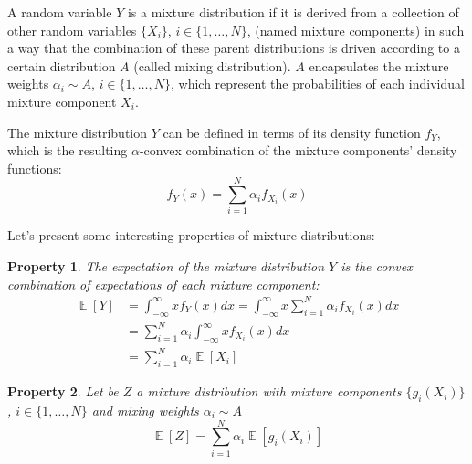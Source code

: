 \documentclass[12pt,a4paper,openright,twoside]{article}
\DeclareMathOperator*{\E}{\mathbb{E}}
\numberwithin{equation}{section}
\theoremstyle{definition}
\theoremstyle{remark}
\theoremstyle{plain}
\newtheorem{mixtureProperty}{Property}
\begin{document}
A random variable $Y$ is a mixture distribution if it is derived from a collection of other random variables $\{X_i\}$, $i\in \{1, \dots, N\}$, (named mixture components) in such a way that the combination of these parent distributions is driven according to a certain distribution $A$ (called mixing distribution). $A$ encapsulates the mixture weights $\alpha_i \sim A$, $i\in \{1, \dots, N\}$, which represent the probabilities of each individual mixture component $X_i$. 

The mixture distribution $Y$ can be defined in terms of its density function $f_Y$, which is the resulting $\alpha$-convex combination of the mixture components' density functions:
\begin{equation} \label{mixtureDef}
    f_{Y} (x) = \sum_{i=1}^{N} \alpha _i f_{X_i}(x)
\end{equation}

Let's present some interesting properties of mixture distributions:

\begin{mixtureProperty} \label{mixtureProperty1}
	The expectation of the mixture distribution $Y$ is the convex combination of expectations of each mixture component: 
    \begin{equation} \label{mixtureProperty1eq}
    \begin{split}
        \E [Y] &= \int_{-\infty}^{\infty} x f_{Y}(x) dx = \int_{-\infty}^{\infty} x \sum_{i=1}^{N} \alpha_i f_{X_i}(x) dx \\
        &= \sum_{i=1}^{N} \alpha_i \int_{-\infty}^{\infty} x f_{X_i}(x) dx \\
        &= \sum_{i=1}^{N} \alpha_i \E [X_i]
    \end{split}
    \end{equation}
\end{mixtureProperty}


\begin{mixtureProperty} \label{mixtureProperty2}
	Let be $Z$ a mixture distribution with mixture components $\{g_i(X_i)\}$, $i\in \{1, \dots, N\}$ and mixing weights $\alpha_i \sim A$
    \begin{equation} \label{mixtureProperty2eq}
        \E [Z] = \sum_{i=1}^{N} \alpha_i \E [g_i(X_i)]
    \end{equation}
\end{mixtureProperty}
\end{document}
